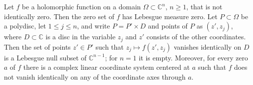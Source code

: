 \begin{lemma}\label{lem:holomorphic-zero-null}
Let $f$ be a holomorphic function on a domain $\Omega\subset\mathbb C^n$, $n\ge1$, that is not identically zero. Then the zero set of $f$ has Lebesgue measure zero. Let $P\subset\Omega$ be a polydisc, let $1\leq j\leq n$, and write $P=P'\times D$ and points of $P$ as $(z',z_j)$, where $D\subset\mathbb C$ is a disc in the variable $z_j$ and $z'$ consists of the other coordinates. Then the set of points $z'\in P'$ such that $z_j\mapsto f(z',z_j)$ vanishes identically on $D$ is a Lebesgue null subset of $\mathbb C^{n-1}$; for $n=1$ it is empty. Moreover, for every zero $a$ of $f$ there is a complex linear coordinate system centered at $a$ such that $f$ does not vanish identically on any of the coordinate axes through $a$.
\end{lemma}

